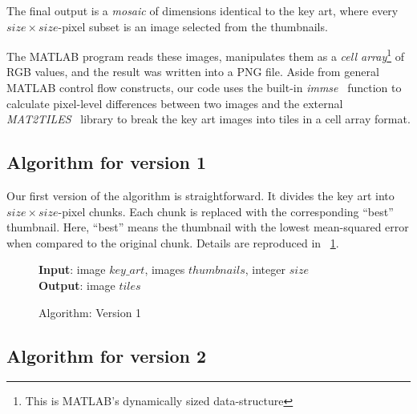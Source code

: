 \documentclass[11pt,conference]{IEEEtran}
\begin{document}
The final output is a \textit{mosaic} of dimensions identical to the key art,
where every \(size \times size\)-pixel subset is an image selected from the
thumbnails.

The MATLAB program reads these images, manipulates them as a \textit{cell
array}\footnote{This is MATLAB's dynamically sized data-structure} of RGB
values, and the result was written into a PNG file. Aside from general MATLAB
control flow constructs, our code uses the built-in \textit{immse}~\cite{immse}
function to calculate pixel-level differences between two images and the
external \textit{MAT2TILES}~\cite{mat2tiles} library to break the key art images
into tiles in a cell array format.

\subsection{Algorithm for version 1}\label{S:algv1}

Our first version of the algorithm is straightforward. It divides the key art
into \(size \times size\)-pixel chunks. Each chunk is replaced with the
corresponding ``best'' thumbnail. Here, ``best'' means the thumbnail with the
lowest mean-squared error when compared to the original chunk. Details are
reproduced in \figurename~\ref{alg:v1}.

\begin{figure}[!t]
    \textbf{Input}: image \(key\_art\), images \(thumbnails\), integer \(size\) \\
    \textbf{Output}: image \(tiles\)
    \begin{algorithmic}
            \ENDFOR
        \ENDFOR
    \end{algorithmic}
    \caption{Algorithm: Version 1}\label{alg:v1}
\end{figure}

\subsection{Algorithm for version 2}\label{S:algv2}
\end{document}
